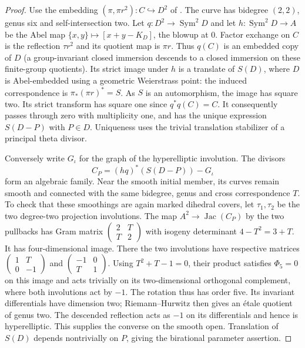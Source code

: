 \documentclass[11pt]{article}
\newcommand{\Jac}{\operatorname{Jac}}
\begin{document}
\begin{proof}
Use the embedding $(\pi,\pi r^2):C\hookrightarrow D^2$ of
\cite[Lemmas 2.4--2.6]{AP}. The curve has bidegree $(2,2)$, genus six
and self-intersection two. Let $q:D^2\to\operatorname{Sym}^2D$
and let $h:\operatorname{Sym}^2D\to A$ be the Abel map
$\{x,y\}\mapsto[x+y-K_D]$, the blowup at $0$. Factor exchange on $C$
is the reflection $\tau r^2$ and its quotient map is $\pi r$.
Thus $q(C)$ is an embedded copy of $D$ (a group-invariant closed
immersion descends to a closed immersion on these finite-group
quotients). Its strict image under $h$ is a translate of $S(D)$,
where $D$ is Abel-embedded using a geometric Weierstrass point:
the induced correspondence is $\pi_*(\pi r)^*=S$. As $S$ is an
automorphism, the image has square two. Its strict transform has
square one since $q^*q(C)=C$. It consequently passes through zero
with multiplicity one, and has the unique expression $S(D-P)$ with
$P\in D$. Uniqueness uses the trivial translation stabilizer of a
principal theta divisor.

Conversely write $G_\iota$ for the graph of the hyperelliptic
involution. The divisors
\[
 C_P=(h q)^*(S(D-P))-G_\iota
\]
form an algebraic family. Near the smooth initial member, its curves
remain smooth and connected with the same bidegree, genus and cross
correspondence $T$. To check that these smoothings are again marked
dihedral covers, let $\tau_1,\tau_2$ be the two degree-two projection
involutions. The map $A^2\to\Jac(C_P)$ by the two pullbacks has Gram
matrix $\left(\begin{smallmatrix}2&T\\T&2\end{smallmatrix}\right)$
with isogeny determinant $4-T^2=3+T$. It has four-dimensional image.
There the two involutions have respective matrices
$\left(\begin{smallmatrix}1&T\\0&-1\end{smallmatrix}\right)$
and $\left(\begin{smallmatrix}-1&0\\T&1\end{smallmatrix}\right)$.
Using $T^2+T-1=0$, their product satisfies $\Phi_5=0$ on this
image and acts trivially on its two-dimensional orthogonal complement,
where both involutions act by $-1$. The rotation thus has order five.
Its invariant differentials have dimension two; Riemann--Hurwitz then
gives an \'etale quotient of genus two. The descended reflection acts
as $-1$ on its differentials and hence is hyperelliptic. This supplies
the converse on the smooth open. Translation of $S(D)$ depends
nontrivially on $P$, giving the birational parameter assertion.


\end{proof}
\end{document}
